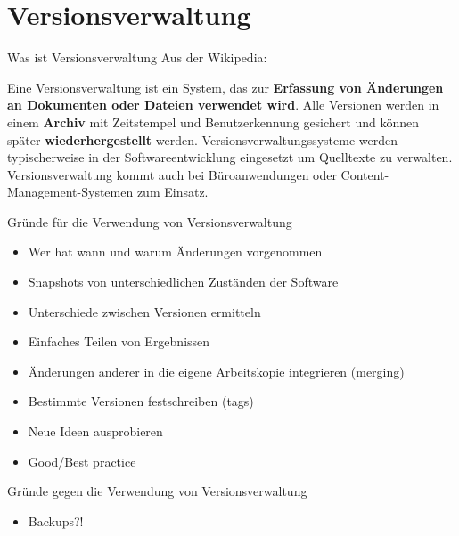 \section{Versionsverwaltung}

\begin{frame}
  \tableofcontents[currentsection]
\end{frame}

\begin{frame}{Was ist Versionsverwaltung}
Aus der Wikipedia:

Eine Versionsverwaltung ist ein System,
das zur \textbf{Erfassung von Änderungen an
Dokumenten oder Dateien verwendet wird}.
Alle Versionen werden in einem \textbf{Archiv} mit
Zeitstempel und Benutzerkennung gesichert und können
später \textbf{wiederhergestellt} werden.
Versionsverwaltungssysteme werden typischerweise in der
Softwareentwicklung eingesetzt um Quelltexte zu verwalten.
Versionsverwaltung kommt auch bei Büroanwendungen oder
Content-Management-Systemen zum Einsatz.
\end{frame}

\begin{frame}{Gründe für die Verwendung von Versionsverwaltung}
  \begin{itemize}
    \item Wer hat wann und warum Änderungen vorgenommen
    \item Snapshots von unterschiedlichen Zuständen der Software
    \item Unterschiede zwischen Versionen ermitteln
    \item Einfaches Teilen von Ergebnissen
    \item Änderungen anderer in die eigene Arbeitskopie integrieren (merging)
    \item Bestimmte Versionen festschreiben (tags)
    \item Neue Ideen ausprobieren
    \item Good/Best practice
  \end{itemize}
\end{frame}

\begin{frame}{Gründe gegen die Verwendung von Versionsverwaltung}
  \begin{itemize}
    \item Backups?!
  \end{itemize}
\end{frame}

